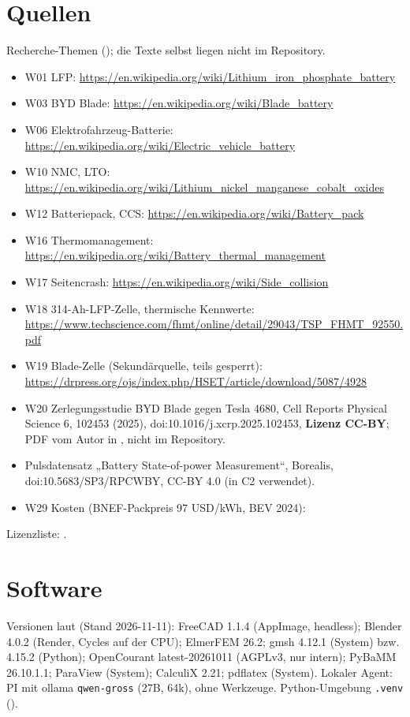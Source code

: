 \documentclass[10pt,a4paper]{article}
\begin{document}
\section{Quellen}
Recherche-Themen (); die Texte selbst liegen nicht im Repository.
\begin{itemize}[nosep]
\item W01 LFP: \url{https://en.wikipedia.org/wiki/Lithium_iron_phosphate_battery}
\item W03 BYD Blade: \url{https://en.wikipedia.org/wiki/Blade_battery}
\item W06 Elektrofahrzeug-Batterie: \url{https://en.wikipedia.org/wiki/Electric_vehicle_battery}
\item W10 NMC, LTO: \url{https://en.wikipedia.org/wiki/Lithium_nickel_manganese_cobalt_oxides}
\item W12 Batteriepack, CCS: \url{https://en.wikipedia.org/wiki/Battery_pack}
\item W16 Thermomanagement: \url{https://en.wikipedia.org/wiki/Battery_thermal_management}
\item W17 Seitencrash: \url{https://en.wikipedia.org/wiki/Side_collision}
\item W18 314-Ah-LFP-Zelle, thermische Kennwerte: \url{https://www.techscience.com/fhmt/online/detail/29043/TSP_FHMT_92550.pdf}
\item W19 Blade-Zelle (Sekundärquelle, teils gesperrt): \url{https://drpress.org/ojs/index.php/HSET/article/download/5087/4928}
\item W20 Zerlegungsstudie BYD Blade gegen Tesla 4680, Cell Reports Physical Science 6, 102453 (2025), doi:10.1016/j.xcrp.2025.102453, \textbf{Lizenz CC-BY}; PDF vom Autor in , nicht im Repository.
\item Pulsdatensatz „Battery State-of-power Measurement“, Borealis, doi:10.5683/SP3/RPCWBY, CC-BY 4.0 (in C2 verwendet).
\item W29 Kosten (BNEF-Packpreis 97 USD/kWh, BEV 2024): 
\end{itemize}
Lizenzliste: .

\section{Software}
Versionen laut  (Stand 2026-11-11): FreeCAD 1.1.4 (AppImage, headless); Blender 4.0.2 (Render, Cycles auf der CPU); ElmerFEM 26.2; gmsh 4.12.1 (System) bzw. 4.15.2 (Python);
OpenCourant latest-20261011 (AGPLv3, nur intern); PyBaMM 26.10.1.1; ParaView (System); CalculiX 2.21; pdflatex (System). Lokaler Agent: PI mit ollama \texttt{qwen-gross} (27B, 64k), ohne Werkzeuge. Python-Umgebung \texttt{.venv}
().
\end{document}
